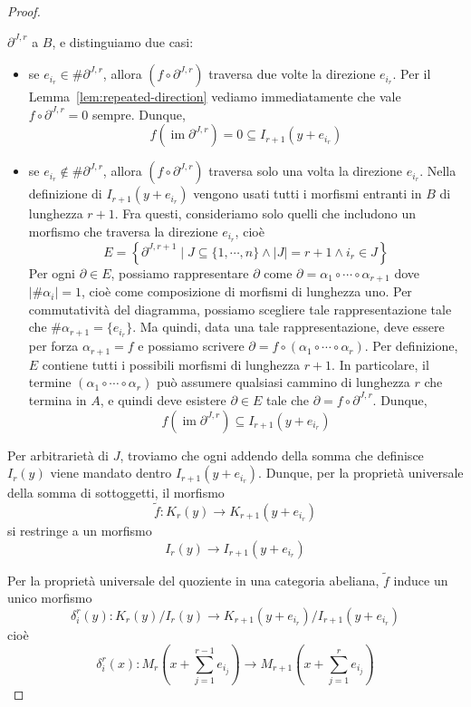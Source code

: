 \documentclass[a4paper]{article}
\DeclareMathOperator{\im}{im}
\begin{document}
\begin{proof}
\begin{itemize}
        \(\partial^{J,r}\) a \(B\), e distinguiamo due casi:
        \begin{itemize}
            \item se \(e_{i_r} \in \#\partial^{J,r}\), allora \((f \circ \partial^{J,r})\) traversa
            due volte la direzione \(e_{i_r}\). Per il Lemma~\ref{lem:repeated-direction}
            vediamo immediatamente che vale \(f \circ \partial^{J,r} = 0\) sempre.
            Dunque,
            \[
                f\left(\im \partial^{J,r}\right) = 0 \subseteq I_{r+1}(y+e_{i_r})
            \]
            \item se \(e_{i_r} \notin \#\partial^{J,r}\), allora \((f \circ \partial^{J,r})\) traversa
            solo una volta la direzione \(e_{i_r}\).
            Nella definizione di \(I_{r+1}(y+e_{i_r})\) vengono usati tutti i morfismi entranti in \(B\) di lunghezza
            \(r+1\). Fra questi, consideriamo solo quelli che includono un morfismo che traversa la direzione
            \(e_{i_r}\), cioè \[
                E = \left\{
                    \partial^{J, r+1} \mid J \subseteq \{1, \cdots, n\} \land |J| = r+1 \land i_r \in J
                \right\}
            \]
            Per ogni \(\partial \in E\), possiamo rappresentare \(\partial\) come
            \(\partial = \alpha_1 \circ \cdots \circ \alpha_{r+1}\) dove \(|\#\alpha_i| = 1\),
            cioè come composizione di morfismi di lunghezza uno. Per commutatività del diagramma,
            possiamo scegliere tale rappresentazione tale che \(\#\alpha_{r+1} = \{e_{i_r}\}\).
            Ma quindi, data una tale rappresentazione, deve essere per forza \(\alpha_{r+1} = f\) e possiamo scrivere
            \(\partial = f \circ (\alpha_1 \circ \cdots \circ \alpha_{r})\).
            Per definizione, \(E\) contiene tutti i possibili morfismi di lunghezza \(r+1\).
            In particolare, il termine \((\alpha_1 \circ \cdots \circ \alpha_{r})\) può assumere
            qualsiasi cammino di lunghezza \(r\) che termina in \(A\), e quindi deve esistere
            \(\partial \in E\) tale che \(\partial = f \circ \partial^{J,r}\).
            Dunque,
            \[
                f\left(\im \partial^{J,r}\right) \subseteq I_{r+1}(y+e_{i_r})
            \]
        \end{itemize}
        Per arbitrarietà di \(J\), troviamo che ogni addendo della somma che definisce
        \(I_r(y)\) viene mandato dentro \(I_{r+1}(y+e_{i_r})\).
        Dunque, per la proprietà universale della somma di sottoggetti, il morfismo
        \[
            \tilde f \colon K_r(y) \to K_{r+1}(y + e_{i_r})
        \]
        si restringe a un morfismo
        \[
            I_r(y) \to I_{r+1}(y + e_{i_r})
        \]
    \end{itemize}
    Per la proprietà universale del quoziente in una categoria abeliana,
    \(\tilde f\) induce un unico morfismo
    \[
        \delta_i^r(y) \colon K_r(y) / I_r(y)
        \to
        K_{r+1}(y + e_{i_r}) / I_{r+1}(y + e_{i_r})
    \]
    cioè \[
        \delta_i^r(x) \colon
        M_r\left(x + \sum_{j=1}^{r-1} e_{i_j}\right)
        \to
        M_{r+1}\left(x + \sum_{j=1}^{r} e_{i_j}\right)
    \]
\end{proof}
\end{document}
